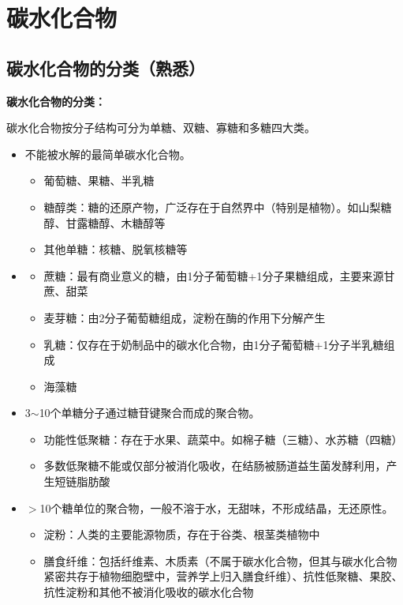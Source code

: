 \chapter{碳水化合物}

\section{碳水化合物的分类（熟悉）}

\begin{tipbox}
\textbf{碳水化合物的分类：}

碳水化合物按分子结构可分为单糖、双糖、寡糖和多糖四大类。

\begin{itemize}[leftmargin=*]
    \item {}不能被水解的最简单碳水化合物。
    \begin{itemize}
        \item 葡萄糖、果糖、半乳糖
        \item 糖醇类：糖的还原产物，广泛存在于自然界中（特别是植物）。如山梨糖醇、甘露糖醇、木糖醇等
        \item 其他单糖：核糖、脱氧核糖等
    \end{itemize}
    \item {}
    \begin{itemize}
        \item 蔗糖：最有商业意义的糖，由1分子葡萄糖+1分子果糖组成，主要来源甘蔗、甜菜
        \item 麦芽糖：由2分子葡萄糖组成，淀粉在酶的作用下分解产生
        \item 乳糖：仅存在于奶制品中的碳水化合物，由1分子葡萄糖+1分子半乳糖组成
        \item 海藻糖
    \end{itemize}
    \item {}3$\sim$10个单糖分子通过糖苷键聚合而成的聚合物。
    \begin{itemize}
        \item 功能性低聚糖：存在于水果、蔬菜中。如棉子糖（三糖）、水苏糖（四糖）
        \item 多数低聚糖不能或仅部分被消化吸收，在结肠被肠道益生菌发酵利用，产生短链脂肪酸
    \end{itemize}
    \item {}$>$10个糖单位的聚合物，一般不溶于水，无甜味，不形成结晶，无还原性。
    \begin{itemize}
        \item 淀粉：人类的主要能源物质，存在于谷类、根茎类植物中
        \item 膳食纤维：包括纤维素、木质素（不属于碳水化合物，但其与碳水化合物紧密共存于植物细胞壁中，营养学上归入膳食纤维）、抗性低聚糖、果胶、抗性淀粉和其他不被消化吸收的碳水化合物
    \end{itemize}
\end{itemize}


\end{tipbox}
